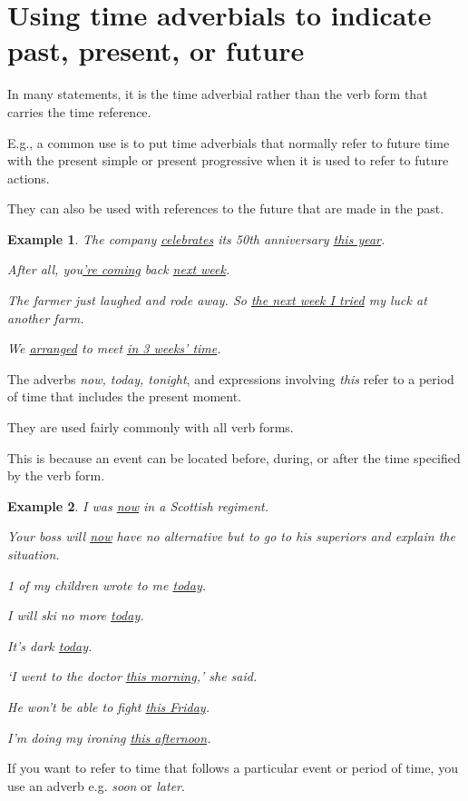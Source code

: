 \documentclass[oneside]{book}
\numberwithin{equation}{section}
\newtheorem{example}{Example}[section]
\begin{document}
\section{Using time adverbials to indicate past, present, or future}
\noindent{} In many statements, it is the time adverbial rather than the verb form that carries the time reference.

%
E.g., a common use is to put time adverbials that normally refer to future time with the present simple or present progressive when it is used to refer to future actions.

They can also be used with references to the future that are made in the past.
\begin{example}
    The company \underline{celebrates} its 50th anniversary \underline{this year}.
    
    After all, you\underline{'re coming} back \underline{next week}.
    
    The farmer just laughed and rode away. So \underline{the next week I tried} my luck at another farm.
    
    We \underline{arranged} to meet \underline{in 3 weeks' time}.
\end{example}
The adverbs \textit{now, today, tonight}, and expressions involving \textit{this} refer to a period of time that includes the present moment.

They are used fairly commonly with all verb forms.

This is because an event can be located before, during, or after the time specified by the verb form.
\begin{example}
    I was \underline{now} in a Scottish regiment.
    
    Your boss will \underline{now} have no alternative but to go to his superiors and explain the situation.
    
    1 of my children wrote to me \underline{today}.
    
    I will ski no more \underline{today}.
    
    It's dark \underline{today}.
    
    `I went to the doctor \underline{this morning},' she said.
    
    He won't be able to fight \underline{this Friday}.
    
    I'm doing my ironing \underline{this afternoon}.
\end{example}
%
\noindent{} If you want to refer to time that follows a particular event or period of time, you use an adverb e.g. \textit{soon} or \textit{later}.
\end{document}
